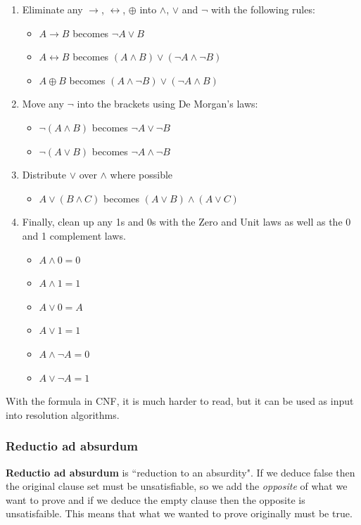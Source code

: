 \documentclass{article}
\begin{document}
\begin{enumerate}
\item Eliminate any $\rightarrow$, $\leftrightarrow$, $\oplus$ into $\wedge$, $\vee$ and $\neg$ with the following rules:
	\begin{itemize}
	\item $A \rightarrow B$ becomes $\neg A \vee B$
	\item $A \leftrightarrow B$ becomes $(A \wedge B) \vee (\neg A \wedge \neg B)$
	\item $A \oplus B$ becomes $(A \wedge \neg B) \vee (\neg A \wedge B)$
	\end{itemize}
\item Move any $\neg$ into the brackets using De Morgan's laws:
	\begin{itemize}
	\item $\neg (A \wedge B)$ becomes $\neg A \vee \neg B$
	\item $\neg (A \vee B)$ becomes $\neg A \wedge \neg B$
	\end{itemize}
\item Distribute $\vee$ over $\wedge$ where possible
	\begin{itemize}
	\item $A \vee (B \wedge C)$ becomes $(A \vee B) \wedge (A \vee C)$
	\end{itemize}
\item Finally, clean up any 1s and 0s with the Zero and Unit laws as well as the 0 and 1 complement laws.
	\begin{itemize}
	\item $A \wedge 0 = 0$
	\item $A \wedge 1 = 1$
	\item $A \vee 0 = A$
	\item $A \vee 1 = 1$
	\item $A \wedge \neg A = 0$
	\item $A \vee \neg A = 1$
	\end{itemize}
\end{enumerate}
With the formula in CNF, it is much harder to read, but it can be used as input into resolution algorithms. 

\subsubsection{Reductio ad absurdum}
\textbf{Reductio ad absurdum} is ``reduction to an absurdity". If we deduce false then the original clause set must be unsatisfiable, so we add the \textit{opposite} of what we want to prove and if we deduce the empty clause then the opposite is unsatisfaible. This means that what we wanted to prove originally must be true. 
\end{document}
